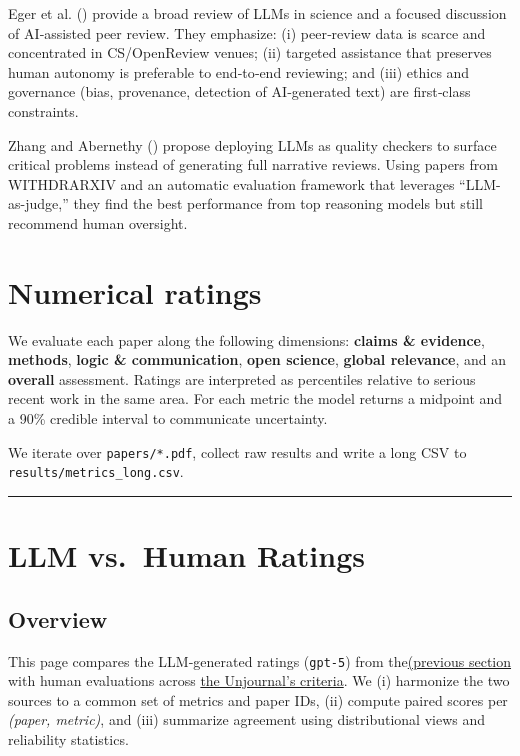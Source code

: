 \documentclass[
  11pt,
  letterpaper,
  DIV=11,
  numbers=noendperiod]{scrreprt}
\begin{document}
Eger et al. () provide a broad review of
LLMs in science and a focused discussion of AI‑assisted peer review.
They emphasize: (i) peer‑review data is scarce and concentrated in
CS/OpenReview venues; (ii) targeted assistance that preserves human
autonomy is preferable to end‑to‑end reviewing; and (iii) ethics and
governance (bias, provenance, detection of AI‑generated text) are
first‑class constraints.

Zhang and Abernethy () propose deploying
LLMs as quality checkers to surface critical problems instead of
generating full narrative reviews. Using papers from WITHDRARXIV and an
automatic evaluation framework that leverages ``LLM-as-judge,'' they
find the best performance from top reasoning models but still recommend
human oversight.


\chapter{Numerical ratings}\label{numerical-ratings}

We evaluate each paper along the following dimensions: \textbf{claims \&
evidence}, \textbf{methods}, \textbf{logic \& communication},
\textbf{open science}, \textbf{global relevance}, and an
\textbf{overall} assessment. Ratings are interpreted as percentiles
relative to serious recent work in the same area. For each metric the
model returns a midpoint and a 90\% credible interval to communicate
uncertainty.

We iterate over \texttt{papers/*.pdf}, collect raw results and write a
long CSV to \texttt{results/metrics\_long.csv}.

\begin{center}\rule{0.5\linewidth}{0.5pt}\end{center}


\chapter{LLM vs.~Human Ratings}\label{llm-vs.-human-ratings}

\section{Overview}\label{overview}

This page compares the LLM‑generated ratings (\texttt{gpt-5}) from
the\href{numerical_ratings.qmd}{(previous section} with human
evaluations across
\href{https://globalimpact.gitbook.io/the-unjournal-project-and-communication-space/policies-projects-evaluation-workflow/evaluation/guidelines-for-evaluators\#undefined-1}{the
Unjournal's criteria}. We (i) harmonize the two sources to a common set
of metrics and paper IDs, (ii) compute paired scores per \emph{(paper,
metric)}, and (iii) summarize agreement using distributional views and
reliability statistics.
\end{document}
